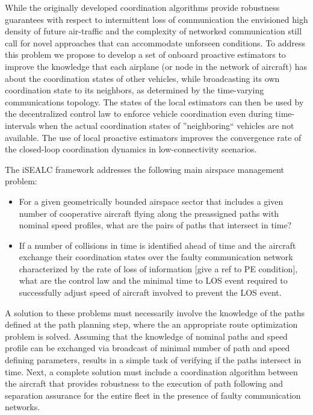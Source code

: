 \documentclass[letter,onecolumn,12pt]{aiaa-tc}
\newcommand{\1}{1_n}
\begin{document}
While the originally developed coordination algorithms provide robustness guarantees with respect to intermittent loss of communication the envisioned high density of future air-traffic and the complexity of networked communication still call for novel approaches that can accommodate unforseen conditions. To address this problem we propose to develop a set of onboard proactive estimators to improve the knowledge that each airplane (or node in the network of aircraft) has about the coordination states of other vehicles, while  broadcasting its own coordination state to its neighbors, as determined by the time-varying communications topology. The states of the local estimators can then be used by the decentralized control law to enforce vehicle coordination even during time-intervals when the actual coordination states of ''neighboring`` vehicles are not available. The use of local proactive estimators improves the convergence rate of the closed-loop coordination dynamics in low-connectivity scenarios.

The iSEALC framework addresses the following main airspace management problem:
\vspace{-2mm}
\begin{itemize}
\setlength{\itemsep}{-4pt}
    \item For a given geometrically bounded airspace sector that includes a given number of cooperative aircraft flying along the preassigned paths with nominal speed profiles, what are the pairs of paths that intersect in time?

    \item If a number of collisions in time is identified ahead of time and the aircraft exchange their coordination states over the faulty communication network characterized by the rate of loss of information [give a ref to PE condition], what are the control law and the minimal time to LOS event required to successfully adjust speed of aircraft involved to prevent the LOS event.
\end{itemize}
\vspace{-2mm}

A solution to these problems must necessarily involve the knowledge of the paths defined at the path planning step, where the an appropriate route optimization  problem is solved. Assuming that the knowledge of nominal paths and speed profile can be exchanged via broadcast of minimal number of path and speed defining parameters, results in a simple task of verifying if the paths intersect in time. Next, a complete solution must include a coordination algorithm between the aircraft that provides robustness to the execution of path following and separation assurance for the entire fleet in the presence of faulty communication networks.
\end{document}
